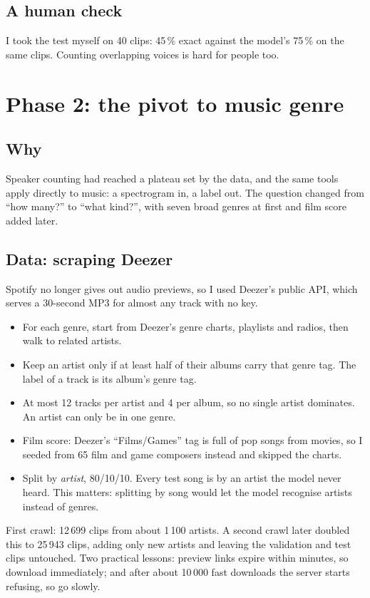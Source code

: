 \documentclass[11pt]{article}
\begin{document}
\subsection{A human check}
I took the test myself on 40 clips: 45\,\% exact against the model's 75\,\% on the same clips. Counting overlapping voices is hard for people too.

\section{Phase 2: the pivot to music genre}

\subsection{Why}
Speaker counting had reached a plateau set by the data, and the same tools apply directly to music: a spectrogram in, a label out. The question changed from ``how many?'' to ``what kind?'', with seven broad genres at first and film score added later.

\subsection{Data: scraping Deezer}
Spotify no longer gives out audio previews, so I used Deezer's public API, which serves a 30-second MP3 for almost any track with no key.
\begin{itemize}
  \item For each genre, start from Deezer's genre charts, playlists and radios, then walk to related artists.
  \item Keep an artist only if at least half of their albums carry that genre tag. The label of a track is its album's genre tag.
  \item At most 12 tracks per artist and 4 per album, so no single artist dominates. An artist can only be in one genre.
  \item Film score: Deezer's ``Films/Games'' tag is full of pop songs from movies, so I seeded from 65 film and game composers instead and skipped the charts.
  \item Split by \emph{artist}, 80/10/10. Every test song is by an artist the model never heard. This matters: splitting by song would let the model recognise artists instead of genres.
\end{itemize}
First crawl: 12\,699 clips from about 1\,100 artists. A second crawl later doubled this to 25\,943 clips, adding only new artists and leaving the validation and test clips untouched. Two practical lessons: preview links expire within minutes, so download immediately; and after about 10\,000 fast downloads the server starts refusing, so go slowly.
\end{document}
